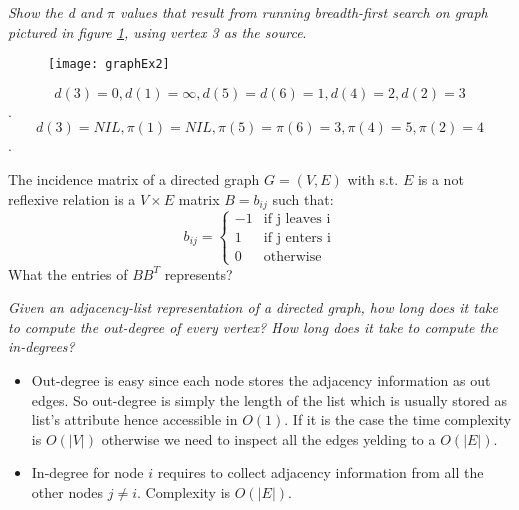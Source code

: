 \begin{problem}
\textit{Show the d and $\pi$ values that result from running breadth-first search on graph pictured in figure \ref{fig:graphex2}, using vertex 3 as the source}.


	\begin{figure}
	\label{fig:graphex2}
	\centering
		\texttt{[image: graphEx2]}
	\end{figure}
\begin{solution}
\[d(3) = 0 , d(1) = \infty , d(5) = d(6) = 1 , d(4) = 2 ,d(2) = 3\].
\[d(3) = NIL , \pi(1) = NIL , \pi(5) = \pi(6) = 3 , \pi(4) = 5 ,\pi(2) = 4\].
	\end{solution}
\end{problem}



\begin{problem}
The incidence matrix of a directed graph $G=(V,E)$ with s.t. $E$ is a not reflexive relation  is a
$V \times E$ matrix $B = b_{ij}$ such that:
\[
    b_{ij}=\left\{
                \begin{array}{ll}
                  -1 &\text{if j leaves i}\\
                  1 &\text{if j enters i}\\
                  0 &\text{otherwise}
                \end{array}
              \right.
  \]
What the entries of $BB^T$ represents?

	\begin{solution}
	
	\end{solution}
\end{problem}



\begin{problem}
\textit{Given an adjacency-list representation of a directed graph, how long does it take
to compute the out-degree of every vertex? How long does it take to compute the
in-degrees?}

	\begin{solution}
\begin{itemize}
\item Out-degree is easy since each node stores the adjacency information as out edges. So out-degree is simply the length of the list which is usually stored as list's attribute hence accessible in $O(1)$. If it 
is the case the time complexity is $O(|V|)$ otherwise we need to inspect all the edges yelding to a $O(|E|)$. 
\item In-degree for node $i$ requires to collect adjacency information from all the other nodes $j \neq i$. Complexity is $O(|E|)$.
\end{itemize}

	\end{solution}
\end{problem}




